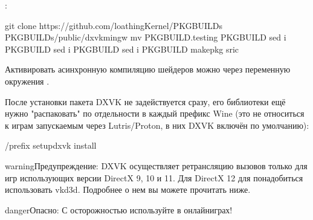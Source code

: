 \documentclass[letterpaper,10pt,russian,openany]{sphinxmanual}
\begin{document}
\sphinxAtStartPar
{}:

\begin{sphinxVerbatim}[commandchars=\\\{\}]
git clone https://github.com/loathingKernel/PKGBUILDs
 PKGBUILDs/public/dxvk\PYGZhy{}mingw
mv PKGBUILD.testing PKGBUILD
sed \PYGZhy{}i  PKGBUILD
sed \PYGZhy{}i  PKGBUILD
sed \PYGZhy{}i  PKGBUILD 
makepkg \PYGZhy{}sric 
\end{sphinxVerbatim}

\sphinxAtStartPar
Активировать асинхронную компиляцию шейдеров можно через переменную окружения .

\sphinxAtStartPar
После установки пакета DXVK не задействуется сразу, его библиотеки ещё нужно "распаковать" по отдельности в каждый префикс Wine
(это не относиться к играм запускаемым через Lutris/Proton, в них DXVK включён по умолчанию):

\begin{sphinxVerbatim}[commandchars=\\\{\}]
\PYGZti{}/prefix setup\PYGZus{}dxvk install 
\end{sphinxVerbatim}

\begin{sphinxadmonition}{warning}{Предупреждение:}
\sphinxAtStartPar
DXVK осуществляет ретрансляцию вызовов только для игр использующих версии DirectX 9, 10 и 11.
Для DirectX 12 для понадобиться использовать vkd3d. Подробнее о нем вы можете прочитать ниже.
\end{sphinxadmonition}

\begin{sphinxadmonition}{danger}{Опасно:}
\sphinxAtStartPar
С осторожностью используйте  в онлайн\sphinxhyphen{}играх!
\end{sphinxadmonition}
\end{document}
